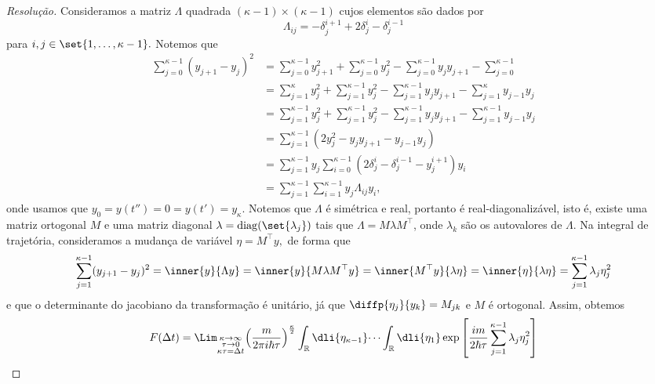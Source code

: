 \begin{proof}[Resolução]
   Consideramos a matriz \(\Lambda\) quadrada \((\kappa-1) \times (\kappa-1)\) cujos elementos são dados por
   \begin{equation*}
      \Lambda_{ij} = -\delta^{i + 1}_{j}  + 2\delta^{i}_{j} - \delta^{i - 1}_{j}
   \end{equation*}
   para \(i,j \in \set{1, \dots, \kappa-1}.\) Notemos que
   \begin{align*}
      \sum_{j = 0}^{\kappa - 1} (y_{j + 1} - y_{j})^2 
      &= \sum_{j = 0}^{\kappa - 1} y_{j + 1}^2 + \sum_{j = 0}^{\kappa - 1} y_j^2 - \sum_{j = 0}^{\kappa - 1} y_{j} y_{j + 1} - \sum_{j = 0}^{\kappa -1}\\
      &= \sum_{j = 1}^{\kappa} y_j^2 + \sum_{j = 1}^{\kappa - 1} y_j^2 - \sum_{j = 1}^{\kappa - 1} y_j y_{j+1} - \sum_{j = 1}^{\kappa} y_{j-1} y_j\\
      &= \sum_{j = 1}^{\kappa-1} y_j^2 + \sum_{j = 1}^{\kappa - 1} y_j^2 - \sum_{j = 1}^{\kappa - 1} y_j y_{j+1} - \sum_{j = 1}^{\kappa-1} y_{j-1} y_j\\
      &= \sum_{j = 1}^{\kappa - 1} (2 y_j^2 - y_j y_{j+1} - y_{j-1} y_j)\\
      &= \sum_{j = 1}^{\kappa - 1} y_j \sum_{i = 0}^{\kappa - 1} (2 \delta^i_j - \delta^{i-1}_{j} - y^{i + 1}_{j})y_i\\
      &= \sum_{j = 1}^{\kappa - 1} \sum_{i = 1}^{\kappa - 1} y_j \Lambda_{ij} y_i,
   \end{align*}
   onde usamos que \(y_0 =  y(t'') = 0 = y(t') = y_\kappa\). Notemos que \(\Lambda\) é simétrica e real, portanto é real-diagonalizável, isto é, existe uma matriz ortogonal \(M\) e uma matriz diagonal \(\lambda = \operatorname{diag}(\set{\lambda_j})\) tais que \(\Lambda = M\lambda M^{\top}\), onde \(\lambda_k\) são os autovalores de \(\Lambda.\) Na integral de trajetória, consideramos a mudança de variável \(\eta = M^\top y,\) de forma que 
   \begin{equation*}
      \sum_{j = 1}^{\kappa - 1} (y_{j+1} - y_j)^2 = \inner{y}{\Lambda y} =\inner{y}{M \lambda M^\top y} = \inner{M^\top y}{\lambda \eta} = \inner{\eta}{\lambda \eta} = \sum_{j = 1}^{\kappa - 1} \lambda_j \eta_j^2
   \end{equation*}
   e que o determinante do jacobiano da transformação é unitário, já que \(\diffp{\eta_j}{y_k} = M_{jk}\) e \(M\) é ortogonal. Assim, obtemos
   \begin{align*}
      F(\Delta t) &= \Lim_{\substack{\kappa \to \infty\\ \tau \to 0\\ \kappa \tau = \Delta t}}{\left(\frac{m}{2\pi i \hbar \tau}\right)^{\frac\kappa2}\int_{\mathbb{R}} \dli{\eta_{\kappa - 1}} \dots \int_{\mathbb{R}} \dli{\eta_1} \exp\left[\frac{im}{2 \hbar \tau} \sum_{j = 1}^{\kappa - 1} \lambda_j \eta_j^2\right]}\\

\end{align*}
\end{proof}
